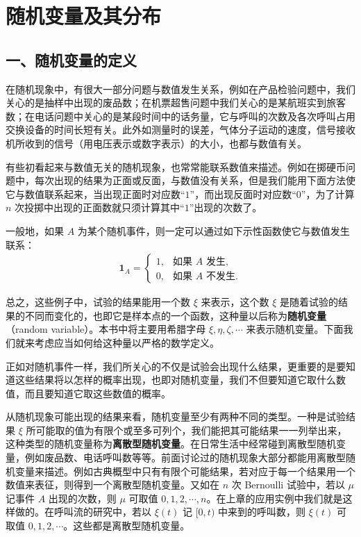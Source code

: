 \documentclass[../../main.tex]{subfiles}
\begin{document}
\section{随机变量及其分布}\label{section:ch03-随机变量及其分布}

\subsection*{一、随机变量的定义}

在随机现象中，有很大一部分问题与数值发生关系，例如在产品检验问题中，我们关心的是抽样中出现的废品数；在机票超售问题中我们关心的是某航班实到旅客数；在电话问题中关心的是某段时间中的话务量，它与呼叫的次数及各次呼叫占用交换设备的时间长短有关。此外如测量时的误差，气体分子运动的速度，信号接收机所收到的信号（用电压表示或数字表示）的大小，也都与数值有关。

有些初看起来与数值无关的随机现象，也常常能联系数值来描述。例如在掷硬币问题中，每次出现的结果为正面或反面，与数值没有关系，但是我们能用下面方法使它与数值联系起来，当出现正面时对应数“$1$”，而出现反面时对应数“$0$”，为了计算 $n$ 次投掷中出现的正面数就只须计算其中“$1$”出现的次数了。

一般地，如果 $A$ 为某个随机事件，则一定可以通过如下示性函数使它与数值发生联系：
\begin{align}
\mathbf{1}_A=
\begin{cases}
1, & \text{如果 } A \text{ 发生},\\
0, & \text{如果 } A \text{ 不发生}.
\end{cases}\label{align:ch03-示性函数}
\end{align}

总之，这些例子中，试验的结果能用一个数 $\xi$ 来表示，这个数 $\xi$ 是随着试验的结果的不同而变化的，也即它是样本点的一个函数，这种量以后称为\textbf{随机变量}（random variable）。本书中将主要用希腊字母 $\xi,\eta,\zeta,\cdots$ 来表示随机变量。下面我们就来考虑应当如何给这种量以严格的数学定义。

正如对随机事件一样，我们所关心的不仅是试验会出现什么结果，更重要的是要知道这些结果将以怎样的概率出现，也即对随机变量，我们不但要知道它取什么数值，而且要知道它取这些数值的概率。

从随机现象可能出现的结果来看，随机变量至少有两种不同的类型。一种是试验结果 $\xi$ 所可能取的值为有限个或至多可列个，我们能把其可能结果一一列举出来，这种类型的随机变量称为\textbf{离散型随机变量}。在日常生活中经常碰到离散型随机变量，例如废品数、电话呼叫数等等。前面讨论过的随机现象大部分都能用离散型随机变量来描述。例如古典概型中只有有限个可能结果，若对应于每一个结果用一个数值来表征，则得到一个离散型随机变量。又如在 $n$ 次 Bernoulli 试验中，若以 $\mu$ 记事件 $A$ 出现的次数，则 $\mu$ 可取值 $0,1,2,\cdots,n$。在上章的应用实例中我们就是这样做的。在呼叫流的研究中，若以 $\xi(t)$ 记 $[0,t)$ 中来到的呼叫数，则 $\xi(t)$ 可取值 $0,1,2,\cdots$。这些都是离散型随机变量。
\end{document}
